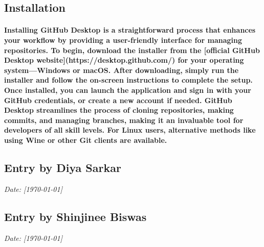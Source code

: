 \documentclass[12pt, a4paper]{article}
\begin{document}
\subsection*{Installation}
\paragraph{Installing GitHub Desktop is a straightforward process that enhances your workflow by providing a user-friendly interface for managing repositories. To begin, download the installer from the [official GitHub Desktop website](https://desktop.github.com/) for your operating system—Windows or macOS. After downloading, simply run the installer and follow the on-screen instructions to complete the setup. Once installed, you can launch the application and sign in with your GitHub credentials, or create a new account if needed. GitHub Desktop streamlines the process of cloning repositories, making commits, and managing branches, making it an invaluable tool for developers of all skill levels. For Linux users, alternative methods like using Wine or other Git clients are available.}


\newpage
{}
\vspace{-2cm}
\subsection*{Entry by Diya Sarkar}
\textit{Date: [\today]}\\

\newpage
{}

\subsection*{Entry by Shinjinee Biswas}
\textit{Date: [\today]}\\

\newpage
{}
\vspace{-2cm}
\end{document}
